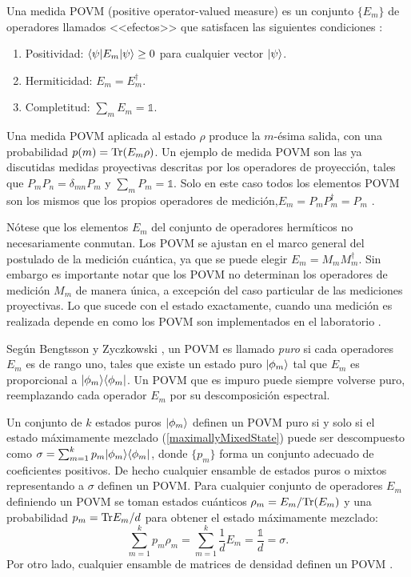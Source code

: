 \begin{definition} Una medida POVM (positive operator-valued measure) es un conjunto $\{E_{m}\}$ de operadores llamados <<efectos>> que satisfacen las siguientes condiciones {\cite{2007geometry}}:
	\begin{enumerate}
		\item Positividad: $\langle \psi |E_m|\psi \rangle \ge 0 $ para cualquier vector $|\psi\rangle$.
		\item Hermiticidad: $E_m=E_{m}^\dagger$.
		\item  Completitud: $\sum_m E_m =\mathds{1}$.
	\end{enumerate}
\end{definition}

Una medida POVM aplicada al estado $\rho$ produce la $m$-ésima salida, con una
probabilidad $p(m)={\rm Tr}(E_m \rho)$. Un ejemplo de medida POVM son las ya
discutidas medidas proyectivas descritas por los operadores de proyección,
tales que $P_m P_n=\delta_{mn}P_{m}$ y $\sum_m P_m = \mathds{1}$. Solo en este
caso todos los elementos POVM son los mismos que los propios operadores de
medición,$E_m=P_m P_m^\dagger=P_m$ {\cite{nielsen_chuang_2010}}.


Nótese que los elementos $E_m$ del conjunto de operadores hermíticos no
necesariamente conmutan. Los POVM se ajustan en el marco general del postulado
de la medición cuántica, ya que se puede elegir $E_m=M_m M_m^{\dagger}$. Sin
embargo es importante notar que los POVM no determinan los operadores de
medición $M_m$ de manera única, a excepción del caso particular de las
mediciones proyectivas. Lo que sucede con el estado exactamente, cuando una
medición es realizada depende en como los POVM son implementados en el
laboratorio {\cite{2007geometry}}.   

Según Bengtsson y Zyczkowski {\cite{2007geometry}}, un POVM es llamado
\textit{puro} si cada operadores $E_m$ es de rango uno, tales que existe un
estado puro $|\phi_m\rangle$ tal que $E_m$ es proporcional a $|\phi_m\rangle \langle\phi_m|$.
Un POVM que es impuro puede siempre volverse puro, reemplazando
cada operador $E_m$ por su descomposición espectral. 

Un conjunto de $k$ estados puros $|\phi_m \rangle$ definen un POVM puro si y solo
si el estado máximamente mezclado (\ref{maximallyMixedState}) puede ser
descompuesto como  $\sigma=\sum_{m=1}^{k}p_m|\phi_m\rangle \langle\phi_m|$, donde
$\{p_m\}$ forma un conjunto adecuado de coeficientes positivos. De hecho
cualquier ensamble de estados puros o mixtos representando a $\sigma$ definen
un POVM\@. Para cualquier conjunto de operadores $E_m$ definiendo un POVM se
toman estados cuánticos $\rho_m=E_m/{\rm Tr}(E_m)$ y una probabilidad $p_m={\rm Tr}
E_m/d$ para obtener el estado máximamente mezclado: 
\begin{equation}
	\sum_{m=1}^{k} p_m\rho _{m}=\sum_{m=1}^k \dfrac{1}{d}E_m=\dfrac{\mathds{1}}{d}=\sigma.
\end{equation}
Por otro lado, cualquier ensamble de matrices de densidad definen un POVM
{\cite{2007geometry}}. 



